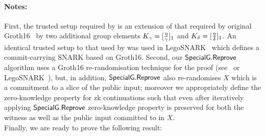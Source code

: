 \noindent \paragraph{Notes:} First, the trusted setup required by \SpecialG is 
an extension of that required by original Groth16~\cite{Groth16} by two additional 
group elements $K_{\gamma} = [\frac{\eta}{\gamma}]_1$ and $K_{\delta} = [\frac{\eta}{\delta}]_1$. 
An identical trusted setup to that used by \SpecialG was used in LegoSNARK~\cite[Fig.~22]{LegoSNARK} which defines 
a commit-carrying SNARK based on Groth16. Second, our ${\mathsf{SpecialG}}.{\mathsf{Reprove}}$ algorithm uses a Groth16 re-randomisation 
technique for the proof (see~\cite[Fig.~1]{RandomizationGroth16} or LegoSNARK~\cite[Fig.~22]{LegoSNARK}), 
but, in addition, ${\mathsf{SpecialG}}.{\mathsf{Reprove}}$ also re-randomises $X$ which is a commitment to a slice of the public input; moreover 
we appropriately define the zero-knowledge property for zk continuations such that even after iteratively applying 
${\mathsf{SpecialG}}.{\mathsf{Reprove}}$ zero-knowledge property is preserved for both the witness as well as the public input committed to in $X$.  \\


\noindent Finally, we are ready to prove the following result:


